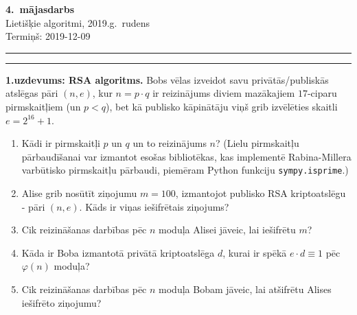 \documentclass[a4paper,12pt]{article}
\begin{document}
\thispagestyle{empty}

\begin{center}
{\bf\Huge 4.\ mājasdarbs} \\[5pt]
Lietišķie algoritmi, 2019.g.\ rudens\\
Termiņš: 2019-12-09
\end{center}

\hrule
\vspace{2pt}
\hrule
\vspace{12pt}



\vspace{6pt}
{\bf 1.uzdevums: RSA algoritms.} 
Bobs vēlas izveidot savu privātās/publiskās 
atslēgas pāri $(n,e)$, kur $n = p \cdot q$ ir reizinājums diviem 
mazākajiem $17$-ciparu pirmskaitļiem (un $p<q$), bet kā 
publisko kāpinātāju viņš grib izvēlēties skaitli $e = 2^{16} + 1$.
\begin{enumerate}[label=(\alph*)]
\item Kādi ir pirmskaitļi $p$ un $q$ un to reizinājums $n$?
(Lielu pirmskaitļu pārbaudīšanai var izmantot esošas bibliotēkas, kas
implementē Rabina-Millera varbūtisko pirmskaitļu pārbaudi, 
piemēram Python funkciju {\tt sympy.isprime}.)
\item Alise grib nosūtīt ziņojumu $m = 100$, izmantojot 
publisko RSA kriptoatslēgu - pāri $(n,e)$. Kāds ir viņas 
iešifrētais ziņojums?
\item Cik reizināšanas darbības pēc $n$ moduļa Alisei jāveic, lai
iešifrētu $m$?
\item Kāda ir Boba izmantotā privātā kriptoatslēga $d$, kurai 
ir spēkā $e \cdot d \equiv 1$ pēc $\varphi(n)$ moduļa?
\item Cik reizināšanas darbības pēc $n$ moduļa Bobam jāveic, lai 
atšifrētu Alises iešifrēto ziņojumu?
\end{enumerate}
\end{document}
